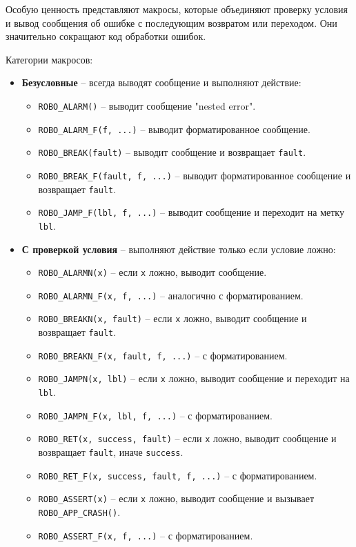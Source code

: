 \documentclass[a4paper,12pt]{article}
\begin{document}
Особую ценность представляют макросы, которые объединяют проверку условия и вывод сообщения об ошибке с последующим возвратом или переходом. Они значительно сокращают код обработки ошибок.

Категории макросов:

\begin{itemize}
    \item \textbf{Безусловные} -- всегда выводят сообщение и выполняют действие:
        \begin{itemize}
            \item \texttt{ROBO\_ALARM()} -- выводит сообщение "nested error".
            \item \texttt{ROBO\_ALARM\_F(f, ...)} -- выводит форматированное сообщение.
            \item \texttt{ROBO\_BREAK(fault)} -- выводит сообщение и возвращает \texttt{fault}.
            \item \texttt{ROBO\_BREAK\_F(fault, f, ...)} -- выводит форматированное сообщение и возвращает \texttt{fault}.
            \item \texttt{ROBO\_JAMP\_F(lbl, f, ...)} -- выводит сообщение и переходит на метку \texttt{lbl}.
        \end{itemize}
    \item \textbf{С проверкой условия} -- выполняют действие только если условие ложно:
        \begin{itemize}
            \item \texttt{ROBO\_ALARMN(x)} -- если \texttt{x} ложно, выводит сообщение.
            \item \texttt{ROBO\_ALARMN\_F(x, f, ...)} -- аналогично с форматированием.
            \item \texttt{ROBO\_BREAKN(x, fault)} -- если \texttt{x} ложно, выводит сообщение и возвращает \texttt{fault}.
            \item \texttt{ROBO\_BREAKN\_F(x, fault, f, ...)} -- с форматированием.
            \item \texttt{ROBO\_JAMPN(x, lbl)} -- если \texttt{x} ложно, выводит сообщение и переходит на \texttt{lbl}.
            \item \texttt{ROBO\_JAMPN\_F(x, lbl, f, ...)} -- с форматированием.
            \item \texttt{ROBO\_RET(x, success, fault)} -- если \texttt{x} ложно, выводит сообщение и возвращает \texttt{fault}, иначе \texttt{success}.
            \item \texttt{ROBO\_RET\_F(x, success, fault, f, ...)} -- с форматированием.
            \item \texttt{ROBO\_ASSERT(x)} -- если \texttt{x} ложно, выводит сообщение и вызывает \texttt{ROBO\_APP\_CRASH()}.
            \item \texttt{ROBO\_ASSERT\_F(x, f, ...)} -- с форматированием.
        \end{itemize}
\end{itemize}
\end{document}
